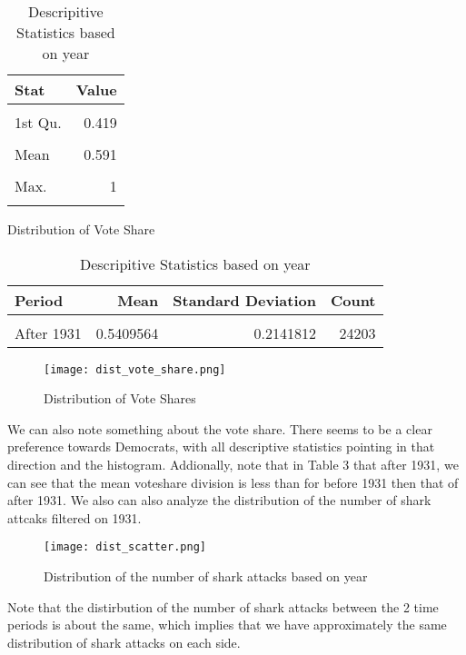 \documentclass[12pt]{article}
\begin{document}
\begin{table}[!h]
    \centering    
    \begin{tabular}{lr}
    \toprule
    Stat & Value\\
    \midrule
    \cellcolor{gray!10}{Min.} & \cellcolor{gray!10}{0.000}\\
    1st Qu. & 0.419\\
    \cellcolor{gray!10}{Median} & \cellcolor{gray!10}{0.559}\\
    Mean & 0.591\\
    \cellcolor{gray!10}{3rd Qu.} & \cellcolor{gray!10}{0.778}\\
    \addlinespace
    Max. & 1\\
    \cellcolor{gray!10}{Std.} & \cellcolor{gray!10}{0.226}\\
    \bottomrule
    \end{tabular}
    \caption{Distribution of Vote Share}
    \vspace{1em} %
    \begin{tabular}{lrrr}
        \toprule
        Period & Mean & Standard Deviation & Count\\
        \midrule
        \cellcolor{gray!10}{Before 1931} & \cellcolor{gray!10}{0.6693001} & \cellcolor{gray!10}{0.2209977} & \cellcolor{gray!10}{15442}\\
        After 1931 & 0.5409564 & 0.2141812 & 24203\\
        \bottomrule
        \end{tabular}
        \caption{Descripitive Statistics based on year}
\end{table}
\begin{figure}[H]
    \centering
    \texttt{[image: dist\_vote\_share.png]}
    \caption{Distribution of Vote Shares}
    \label{fig:enter-label1}
\end{figure}    
We can also note something about the vote share. There seems to be a clear preference towards Democrats, with all descriptive statistics pointing in that direction and the histogram. Addionally, note that in Table 3 that after 1931, we can see that the mean voteshare division is less than for before 1931 then that of after 1931. We also can also analyze the distribution of the number of shark attcaks filtered on 1931. 
\begin{figure}[H]
    \centering
    \texttt{[image: dist\_scatter.png]}
    \caption{Distribution of the number of shark attacks based on year}
    \label{fig:enter-label1234}
\end{figure}
Note that the distirbution of the number of shark attacks between the 2 time periods is about the same, which implies that we have approximately the same distribution of shark attacks on each side. 
\newpage
\end{document}
